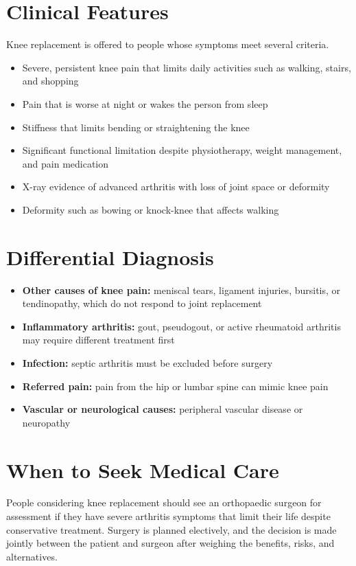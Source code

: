\section*{Clinical Features}
Knee replacement is offered to people whose symptoms meet several criteria.
\begin{itemize}
    \item Severe, persistent knee pain that limits daily activities such as walking, stairs, and shopping
    \item Pain that is worse at night or wakes the person from sleep
    \item Stiffness that limits bending or straightening the knee
    \item Significant functional limitation despite physiotherapy, weight management, and pain medication
    \item X-ray evidence of advanced arthritis with loss of joint space or deformity
    \item Deformity such as bowing or knock-knee that affects walking
\end{itemize}

\section*{Differential Diagnosis}
\begin{itemize}
    \item \textbf{Other causes of knee pain:} meniscal tears, ligament injuries, bursitis, or tendinopathy, which do not respond to joint replacement
    \item \textbf{Inflammatory arthritis:} gout, pseudogout, or active rheumatoid arthritis may require different treatment first
    \item \textbf{Infection:} septic arthritis must be excluded before surgery
    \item \textbf{Referred pain:} pain from the hip or lumbar spine can mimic knee pain
    \item \textbf{Vascular or neurological causes:} peripheral vascular disease or neuropathy
\end{itemize}

\section*{When to Seek Medical Care}
People considering knee replacement should see an orthopaedic surgeon for assessment if they have severe arthritis symptoms that limit their life despite conservative treatment. Surgery is planned electively, and the decision is made jointly between the patient and surgeon after weighing the benefits, risks, and alternatives.

